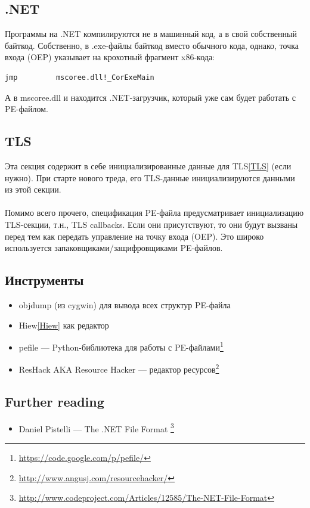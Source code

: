 \subsection{.NET}

Программы на .NET компилируются не в машинный код, а в свой собственный байткод.
Собственно, в .exe-файлы байткод вместо обычного кода, однако, точка входа (\ac{OEP}) указывает на крохотный фрагмент
x86-кода:

\begin{lstlisting}
jmp         mscoree.dll!_CorExeMain
\end{lstlisting}

А в mscoree.dll и находится .NET-загрузчик, который уже сам будет работать с PE-файлом.

\subsection{TLS}

Эта секция содержит в себе инициализированные данные для \ac{TLS}\ref{TLS} (если нужно). При старте нового треда,
его \ac{TLS}-данные инициализируются данными из этой секции. \\
\\
Помимо всего прочего, спецификация PE-файла предусматривает инициализацию \ac{TLS}-секции, т.н., TLS callbacks.
Если они присутствуют, то они будут вызваны перед тем как передать управление на точку входа (\ac{OEP}).
Это широко используется запаковщиками/защифровщиками PE-файлов.

\subsection{Инструменты}

\begin{itemize}
\item
{}
objdump (из cygwin) для вывода всех структур PE-файла

\item
Hiew\ref{Hiew} как редактор

\item
pefile --- Python-библиотека для работы с PE-файлами\footnote{\url{https://code.google.com/p/pefile/}}

\item
\label{ResHack}
ResHack \acs{AKA} Resource Hacker --- редактор ресурсов\footnote{\url{http://www.angusj.com/resourcehacker/}}
\end{itemize}

\subsection{Further reading}

\begin{itemize}
\item
Daniel Pistelli --- The .NET File Format \footnote{\url{http://www.codeproject.com/Articles/12585/The-NET-File-Format}}
\end{itemize}

